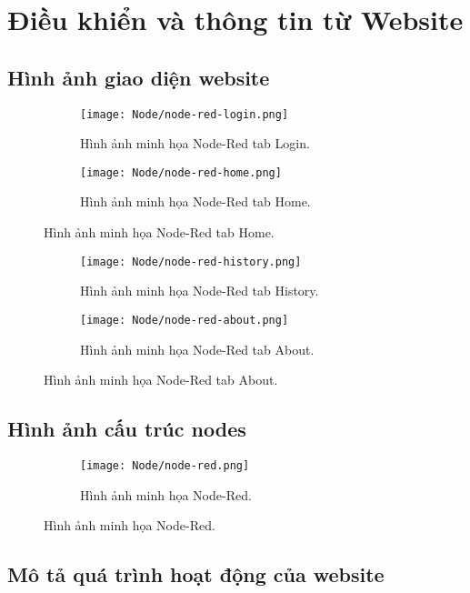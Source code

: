 \documentclass[12pt, a4paper]{article}
\begin{document}
\section{Điều khiển và thông tin từ Website}
\subsection{Hình ảnh giao diện website} 
\newpage
\begin{figure}[!h]
        \centering
        \begin{subfigure}{\textwidth}
            \centering
            \texttt{[image: Node/node-red-login.png]}
            \caption{Hình ảnh minh họa Node-Red tab Login.}
        \end{subfigure}
        \begin{subfigure}{\textwidth}
            \centering
            \texttt{[image: Node/node-red-home.png]}
            \caption{Hình ảnh minh họa Node-Red tab Home.}
        \end{subfigure}
\end{figure}
\pagebreak
\begin{figure}[!h]
        \centering
        \begin{subfigure}{\textwidth}
            \centering
            \texttt{[image: Node/node-red-history.png]}
            \caption{Hình ảnh minh họa Node-Red tab History.}
        \end{subfigure}
        \begin{subfigure}{\textwidth}
            \centering
            \texttt{[image: Node/node-red-about.png]}
            \caption{Hình ảnh minh họa Node-Red tab About.}
        \end{subfigure}
\end{figure}
\newpage
\subsection{Hình ảnh cấu trúc nodes}
\begin{figure}[!h]
        \centering
        \begin{subfigure}{\textwidth}
            \centering
            \texttt{[image: Node/node-red.png]}
            \caption{Hình ảnh minh họa Node-Red.}
        \end{subfigure}
\end{figure}
\pagebreak
\subsection{Mô tả quá trình hoạt động của website}
\end{document}
